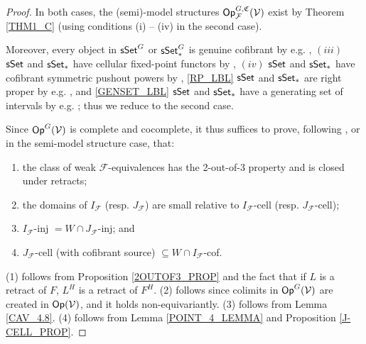 \documentclass[a4paper,10pt
,draft
]{article}%
\renewcommand{\F}{\mathcal F}
\renewcommand{\1}{\eta}%
\begin{document}
\begin{proof}
      In both cases, the (semi)-model structures $\Op_\F^{G, \mathfrak C}(\V)$ exist by Theorem \ref{THM1_C}
      (using conditions (i) -- (iv) in the second case).
      
      Moreover,
      every object in $\mathsf{sSet}^G$ or $\sSet^G_{\**}$ is genuine cofibrant by e.g. \cite[Remark 5.71]{BP_geo},
      $(iii)$ $\mathsf{sSet}$ and $\sSet_{\**}$ have cellular fixed-point functors by \cite[Example 2.14]{Ste16},
      $(iv)$ $\mathsf{sSet}$ and $\sSet_{\**}$ have cofibrant symmetric pushout powers by \cite[Remark 6.18]{BP_geo},
      \ref{RP_LBL} $\mathsf{sSet}$ and $\sSet_{\**}$ are right proper by e.g. \cite[Thm. 2.1.1 and Prop 4.1.1]{JT_simp},
      and
      \ref{GENSET_LBL} $\mathsf{sSet}$ and $\sSet_{\**}$ have a generating set of intervals
      by e.g. \cite[Lemma 1.12]{BM13};
      thus we reduce to the second case.
      
      Since $\mathsf{Op}^G(\mathcal V)$ is complete and cocomplete, it thus suffices to prove,
      following \cite[Theorem 2.1.19]{Hov}, or \cite[Theorem 2.2.2]{WY} in the semi-model structure case, that:
      \begin{enumerate}[label = (\arabic*)]
      \item the class of weak $\F$-equivalences has the 2-out-of-3 property and is closed under retracts;
      \item the domains of $I_{\F}$ (resp. $J_{\F}$) are small relative to $I_{\F}$-cell (resp. $J_{\F}$-cell);
      \item $I_{\F}$-inj $= W\cap J_{\F}$-inj; and
      \item $J_{\F}$-cell (with cofibrant source) $\subseteq W\cap I_{\F}$-cof.
      \end{enumerate}
      (1) follows from Proposition \ref{2OUTOF3_PROP} and the fact that if $L$ is a retract of $F$, $L^H$ is a retract of $F^H$.
      (2) follows since colimits in $\mathsf{Op}^G(\mathcal V)$ are created in $\mathsf{Op}(\mathcal V)$, and it holds non-equivariantly.
      (3) follows from Lemma \ref{CAV_4.8}.
      (4) follows from Lemma \ref{POINT_4_LEMMA} and Proposition \ref{J-CELL_PROP}.
\end{proof}
\end{document}
